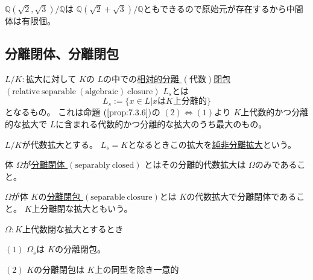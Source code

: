 \documentclass[../master_galois_theory]{subfiles}
\begin{document}
\begin{exam}
  $\mathbb{Q}(\sqrt{2} , \sqrt{3})/\mathbb{Q}$は
  $\mathbb{Q}(\sqrt{2} + \sqrt{3})/\mathbb{Q}$ともできるので原始元が存在するから中間体は有限個。
\end{exam}

\subsection{分離閉体、分離閉包}

\begin{defi}
  $L/K:$拡大に対して $K$の $L$の中での\underline{相対的分離 $(代数)$閉包 $(\mathrm{relative \  separable \  (algebraic) \  closure})$} $L_s$とは
  \[
  L_s := \{ x \in L | xは K上分離的 \}
  \]
  となるもの。
  これは命題 $(\mathrm{\ref{prop:7.3.6}})$の $(2) \Leftrightarrow (1)$より $K$上代数的かつ分離的な拡大で
  $L$に含まれる代数的かつ分離的な拡大のうち最大のもの。
\end{defi}

\begin{defi}
  $L/K$が代数拡大とする。
  $L_s = K$となるときこの拡大を\underline{純非分離拡大}という。
\end{defi}

\begin{defi}
  体 $\Omega$が\underline{分離閉体 $(\mathrm{separably \  closed})$}
  とはその分離的代数拡大は $\Omega$のみであること。
\end{defi}

\begin{defi}
  $\Omega$が体 $K$の\underline{分離閉包 $(\mathrm{separable \  closure})$}とは
  $K$の代数拡大で分離閉体であること。
  $K$上分離閉な拡大ともいう。
\end{defi}

\begin{prop} \label{prop:9.11}
  $\Omega:K$上代数閉な拡大とするとき

  $(1)$
  $\Omega_s$は $K$の分離閉包。

  $(2)$
  $K$の分離閉包は $K$上の同型を除き一意的
\end{prop}
\end{document}
